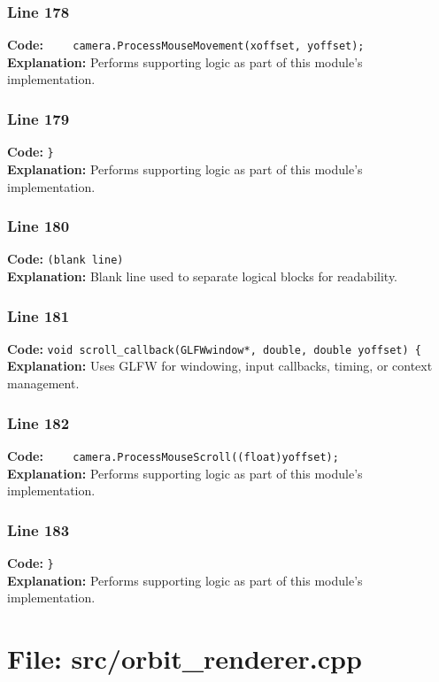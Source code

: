 \documentclass[11pt,a4paper]{article}
\begin{document}
\subsubsection*{Line 178}
\textbf{Code:} \verb|    camera.ProcessMouseMovement(xoffset, yoffset);|\\
\textbf{Explanation:} Performs supporting logic as part of this module's implementation.

\subsubsection*{Line 179}
\textbf{Code:} \verb|}|\\
\textbf{Explanation:} Performs supporting logic as part of this module's implementation.

\subsubsection*{Line 180}
\textbf{Code:} \texttt{(blank line)}\\
\textbf{Explanation:} Blank line used to separate logical blocks for readability.

\subsubsection*{Line 181}
\textbf{Code:} \verb|void scroll_callback(GLFWwindow*, double, double yoffset) {|\\
\textbf{Explanation:} Uses GLFW for windowing, input callbacks, timing, or context management.

\subsubsection*{Line 182}
\textbf{Code:} \verb|    camera.ProcessMouseScroll((float)yoffset);|\\
\textbf{Explanation:} Performs supporting logic as part of this module's implementation.

\subsubsection*{Line 183}
\textbf{Code:} \verb|}|\\
\textbf{Explanation:} Performs supporting logic as part of this module's implementation.

\newpage
\section{File: src/orbit\_renderer.cpp}
\end{document}
